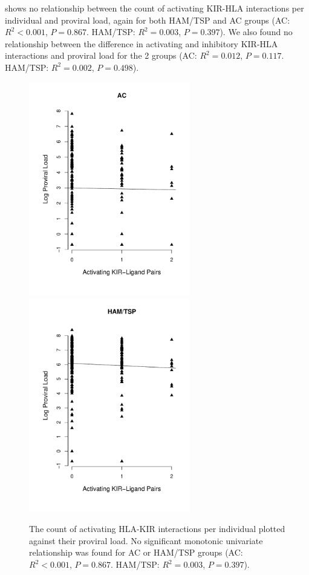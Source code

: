  shows no relationship between the count of activating KIR-HLA interactions per individual and proviral load, again for both HAM/TSP and AC groups (AC: $R^2 < 0.001$, $P = 0.867$. HAM/TSP: $R^2 = 0.003$, $P = 0.397$). We also found no relationship between the difference in activating and inhibitory KIR-HLA interactions and proviral load for the 2 groups (AC: $R^2 = 0.012$, $P = 0.117$. HAM/TSP: $R^2 = 0.002$, $P = 0.498$).

\begin{figure}[htp]
\centering
\includegraphics[width=7cm]{./Figures/chapter7/figureActivAC}%
\hspace{0cm}%
\includegraphics[width=7cm]{./Figures/chapter7/figureActivHAM} \\
\caption[Activating HLA-KIR interactions and proviral load]{The count of activating HLA-KIR interactions per individual plotted against their proviral load. No significant monotonic univariate relationship was found for AC or HAM/TSP groups (AC: $R^2 < 0.001$, $P = 0.867$. HAM/TSP: $R^2 = 0.003$, $P = 0.397$).}
\label{chapter7/figure2}
\end{figure}

